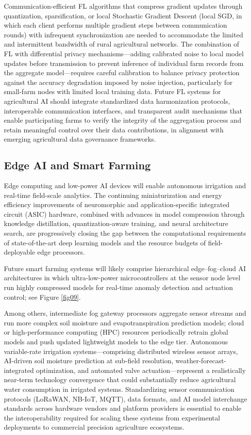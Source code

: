 \documentclass[land,review,accept,pdftex,oneauthor]{Definitions/mdpi}
\begin{document}
Communication-efficient FL algorithms that compress gradient updates through quantization, sparsification, or {local Stochastic Gradient Descent (local SGD, in which each client performs multiple gradient steps between communication rounds)} with infrequent synchronization are needed to accommodate the limited and intermittent bandwidth of rural agricultural networks. The combination of FL with differential privacy mechanisms---adding calibrated noise to local model updates before transmission to prevent inference of individual farm records from the aggregate model---requires careful calibration to balance privacy protection against the accuracy degradation imposed by noise injection, particularly for small-farm nodes with limited local training data. Future FL systems for agricultural AI should integrate standardized data harmonization protocols, interoperable communication interfaces, and transparent audit mechanisms that enable participating farms to verify the integrity of the aggregation process and retain meaningful control over their data contributions, in alignment with emerging agricultural data governance frameworks.

\subsection{Edge AI and Smart Farming}

Edge computing and low-power AI devices will enable autonomous irrigation and real-time field-scale analytics. The continuing miniaturization and energy efficiency improvements of neuromorphic and application-specific integrated circuit (ASIC) hardware, combined with advances in model compression through knowledge distillation, quantization-aware training, and neural architecture search, are progressively closing the gap between the computational requirements of state-of-the-art deep learning models and the resource budgets of field-deployable edge processors. 

Future smart farming systems will likely comprise hierarchical edge--fog--cloud AI architectures in which ultra-low-power microcontrollers at the sensor node level run highly compressed models for real-time anomaly detection and actuation control; see Figure \ref{fig09}.


Among others, intermediate fog gateway processors aggregate sensor streams and run more complex soil moisture and evapotranspiration prediction models; cloud or {high-performance computing (}HPC{)} resources periodically retrain global models and push updated lightweight models to the edge tier. Autonomous variable-rate irrigation systems---comprising distributed wireless sensor arrays, AI-driven soil moisture prediction at sub-field resolution, weather-forecast-integrated optimization, and automated valve actuation---represent a realistically near-term technology convergence that could substantially reduce agricultural water consumption in irrigated systems. Standardizing sensor communication protocols (LoRaWAN, NB-IoT, MQTT), data formats, and AI model interchange standards across hardware vendors and platform providers is essential to enable the interoperability required for scaling these systems from experimental deployments to commercial precision agriculture ecosystems.
\end{document}
